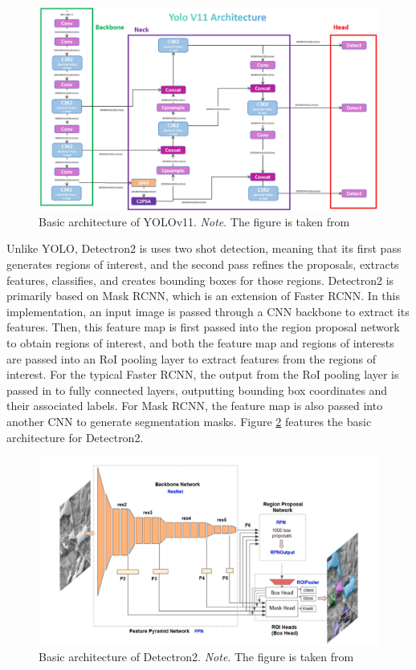 \documentclass[stu,12pt,floatsintext]{apa7}
\begin{document}
\begin{figure}[!htb]
	\centering
	\includegraphics[width=0.75\linewidth]{yolov11.png}
	\caption{Basic architecture of YOLOv11.
		\textit{Note}. The figure is taken from \textcite{rao_yolov11_2024}}
	\label{fig:YOLOv11-architecture}
\end{figure}



Unlike YOLO, Detectron2 is uses two shot detection, meaning that its first pass generates regions of interest, and the second pass refines the proposals, extracts features, classifies, and creates bounding boxes for those regions. Detectron2 is primarily based on Mask RCNN, which is an extension of Faster RCNN. In this implementation, an input image is passed through a CNN backbone to extract its features. Then, this feature map is first passed into the region proposal network to obtain regions of interest, and both the feature map and regions of interests are passed into an RoI pooling layer to extract features from the regions of interest. For the typical Faster RCNN, the output from the RoI pooling layer is passed in to fully connected layers, outputting bounding box coordinates and their associated labels. For Mask RCNN, the feature map is also passed into another CNN to generate segmentation masks. Figure \ref{fig:Detectron2-architecture} features the basic architecture for Detectron2.

%
\begin{figure}[!htb]
	\centering
	\includegraphics[width=0.75\linewidth]{images/Detectron2_architecture.png}
	\caption{Basic architecture of Detectron2. \textit{Note}. The figure is taken from \textcite{ackermann_automated_2022}}
	\label{fig:Detectron2-architecture}
\end{figure}
\end{document}
